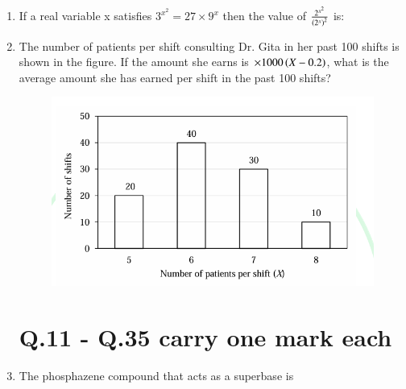\documentclass[journal,12pt,onecolumn]{IEEEtran}
\theoremstyle{remark}
\begin{document}
\begin{enumerate}
\item If a real variable x satisfies $3^{x^{2}}=27\times9^{x}$ then the value of $\frac{2^{x^{2}}}{\left(2^{x}\right)^{2}}$ is:
    \begin{enumerate}
    \end{enumerate}      \hfill{}



\item The number of patients per shift  consulting Dr. Gita in her past 100 shifts is shown in the figure. If the amount she earns is $\times1000\left(X-0.2\right)$, what is the average amount  she has earned per shift in the past 100 shifts?
    \begin{figure}[H]   
        \centering
        \includegraphics[width=0.4\columnwidth]{figs/q10.png}
        \caption*{}
        \label{fig:placeholder}
    \end{figure}
    \begin{enumerate}
    \end{enumerate}      \hfill{}

\section*{Q.11 - Q.35 carry one mark each}    
  \item The phosphazene compound that acts as a superbase is
  \begin{multicols}{2}
      

\end{multicols}
\end{enumerate}
\end{document}
